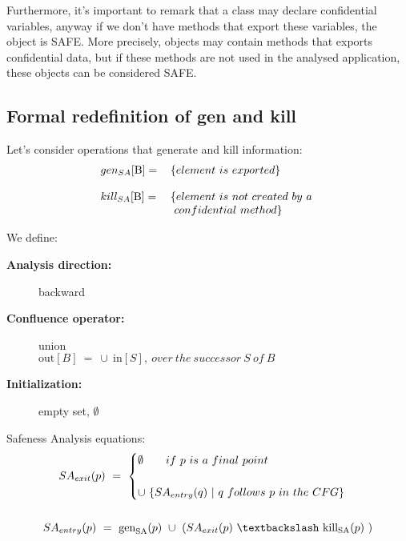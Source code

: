 \documentclass[letterpaper,twocolumn,10pt]{article}
\begin{document}
Furthermore, it's important to remark that a class may declare confidential variables, anyway if we don't have methods that export these variables, the object is SAFE. More precisely, objects may contain methods that exports confidential data, but if these methods are not used in the analysed application, these objects can be considered SAFE. \\

\subsection{Formal redefinition of gen and kill}
Let's consider operations that generate and kill information:
\begin{align*}
\begin{tabular}{  l l }
	$ gen_{SA}[\text{B}]= $ & $ \{ element\ is\ exported \} $\\ 
	& \\                  
	$  kill_{SA}[\text{B}]= $ & $ \{ element\ is\ not\ created\ by\ a\ $\\ 
	& $\ confidential\ method \} $ \\
\end{tabular}
\end{align*}

We define: 
\begin{description}
\item[\textbf{Analysis direction:}] backward
\item[\textbf{Confluence operator: }] union\\ $ \text{out}[B]\ =\ \cup\ \text{in}[S],\ over\ the\ successor\ S\ of\ B\  $
\item[\textbf{Initialization: }] empty set, \quad $ \emptyset $
\end{description}

Safeness Analysis equations:
\begin{gather*}
SA_\textrm{$exit$}(p)\ =\ 
\begin{cases}
\emptyset\qquad if\ p\ is\ a\ final\ point\ \\ \\
\cup\ \lbrace SA_\textrm{$entry$}(q)\ |\ q\ follows\ p\ in\ the\ CFG \rbrace 
\end{cases} \\ \\
SA_\textrm{$entry$}(p)\ =\ \text{gen}_\textrm{SA}(p)\ \cup\ (SA_\textrm{$exit$}(p)\ \textbackslash\ \text{kill}_\textrm{SA}(p)\ )
\end{gather*}
\end{document}
